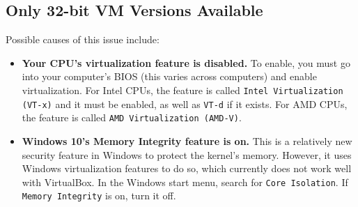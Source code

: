 \documentclass[11pt]{article}
\begin{document}
\subsection{Only 32-bit VM Versions Available}
Possible causes of this issue include:
\begin{itemize}
    \item \textbf{Your CPU's virtualization feature is disabled.} To enable, you must go into your computer's BIOS (this varies across computers) and enable virtualization. For Intel CPUs, the feature is called \texttt{Intel Virtualization (VT-x)} and it must be enabled, as well as \texttt{VT-d} if it exists. For AMD CPUs, the feature is called \texttt{AMD Virtualization (AMD-V)}.
    \item \textbf{Windows 10's Memory Integrity feature is on.} This is a relatively new security feature in Windows to protect the kernel's memory. However, it uses Windows virtualization features to do so, which currently does not work well with VirtualBox. In the Windows start menu, search for \texttt{Core Isolation}. If \texttt{Memory Integrity} is on, turn it off.
\end{itemize}
\end{document}
